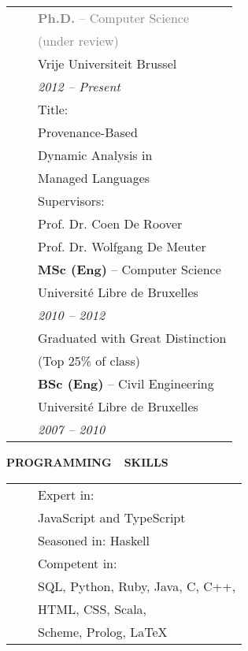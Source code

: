 \documentclass[a4paper,11pt,english]{article}
\newcommand{\LeftColumn}[0]{6.0cm}
\newcommand{\ItemSkip}[0]{4pt}
\newcommand{\SubItemSkip}[0]{0pt}
\newcommand{\SubSubItemSkip}[0]{0pt}
\newcommand{\Bullet}[0]{\faCaretRight~~}
\newcommand{\Rubric}[1]{\colorbox{gray!20}{\parbox{\linewidth}{\centering\sffamily\bfseries{}#1}}}
\begin{document}
\begin{minipage}[t]{\LeftColumn}
\begin{tabular}{@{}l@{}l@{}}
\textcolor{gray}{\Bullet} & \textcolor{gray}{\textbf{Ph.D.} -- Computer Science} \\[\SubSubItemSkip]
& \quad \textcolor{gray}{(under review)} \\[\SubItemSkip]
& Vrije Universiteit Brussel \\[\SubItemSkip]
& \emph{2012 -- Present} \\[\SubItemSkip]
& Title:\\[\SubSubItemSkip]
& \quad Provenance-Based \\[\SubSubItemSkip]
& \quad Dynamic Analysis in \\[\SubSubItemSkip]
& \quad Managed Languages \\[\SubItemSkip]
& Supervisors: \\[\SubSubItemSkip]
& \quad Prof. Dr. Coen De Roover\\[\SubSubItemSkip]
& \quad Prof. Dr. Wolfgang De Meuter\\[\ItemSkip]
\Bullet & \textbf{MSc (Eng)} -- Computer Science \\[\SubItemSkip]
& Université Libre de Bruxelles \\[\SubItemSkip]
& \emph{2010 -- 2012} \\[\SubItemSkip]
& Graduated with Great Distinction \\[\SubSubItemSkip]
& \quad (Top 25\% of class) \\[\ItemSkip]
\Bullet & \textbf{BSc (Eng)} -- Civil Engineering \\[\SubItemSkip]
& Université Libre de Bruxelles \\[\SubItemSkip]
& \emph{2007 -- 2010} \\[0pt]
\end{tabular}

\vspace{12pt}\Rubric{\faCode \quad PROGRAMMING~~SKILLS}\vspace{8pt}

\begin{tabularx}{\linewidth}{@{}l@{}l@{}}
\Bullet & Expert in: \\[0pt]
& \quad JavaScript and TypeScript \\[\ItemSkip]
\Bullet & Seasoned in: Haskell\\[\ItemSkip]
\Bullet & Competent in: \\[0pt]
& \quad SQL, Python, Ruby, Java, C, C++, \\[0pt]
& \quad HTML, CSS, Scala, \\[0pt]
& \quad Scheme, Prolog, LaTeX \\[0pt]
\end{tabularx}

\end{minipage}
\end{document}
